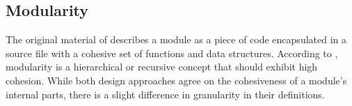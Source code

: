 \subsection{Modularity} \label{subsec_modularity}

The original material of \textcite[82]{robert_c_martin_clean_2018} describes a module as a
piece of code encapsulated in a source file with a cohesive set of functions and data
structures. According to \textcite[22]{mannaert_normalized_2016}, modularity is a
hierarchical or recursive concept that should exhibit high cohesion. While both design
approaches agree on the cohesiveness of a module's internal parts, there is a slight
difference in granularity in their definitions.